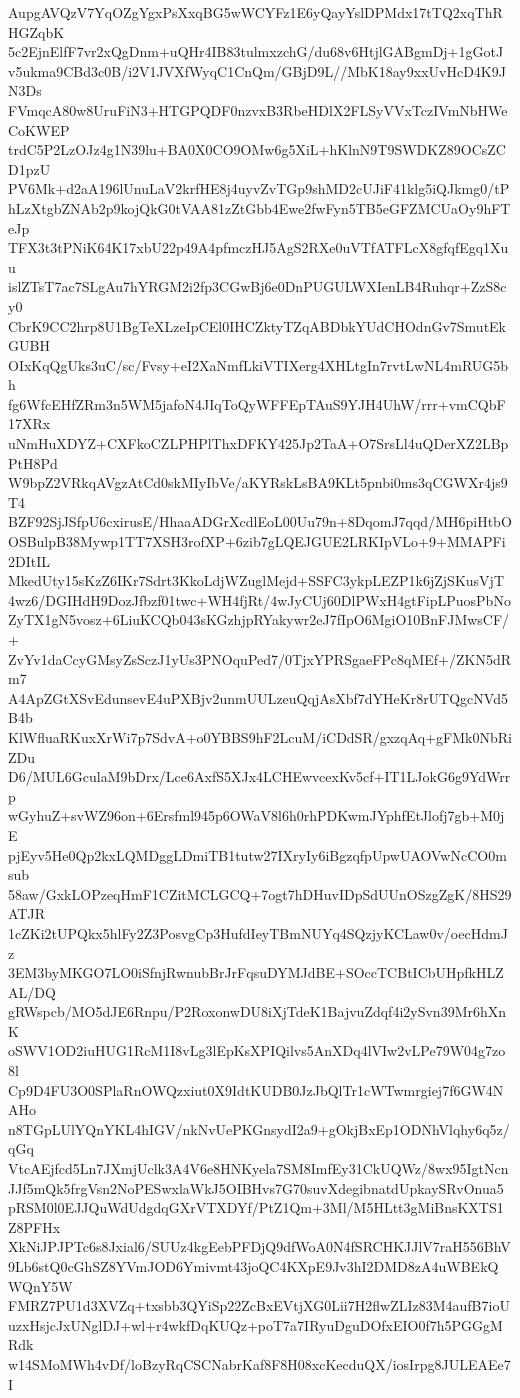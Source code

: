 AupgAVQzV7YqOZgYgxPsXxqBG5wWCYFz1E6yQayYslDPMdx17tTQ2xqThRHGZqbK
5c2EjnElfF7vr2xQgDnm+uQHr4IB83tulmxzchG/du68v6HtjlGABgmDj+1gGotJ
v5ukma9CBd3c0B/i2V1JVXfWyqC1CnQm/GBjD9L//MbK18ay9xxUvHcD4K9JN3Ds
FVmqcA80w8UruFiN3+HTGPQDF0nzvxB3RbeHDlX2FLSyVVxTczIVmNbHWeCoKWEP
trdC5P2LzOJz4g1N39lu+BA0X0CO9OMw6g5XiL+hKlnN9T9SWDKZ89OCsZCD1pzU
PV6Mk+d2aA196lUnuLaV2krfHE8j4uyvZvTGp9shMD2cUJiF41klg5iQJkmg0/tP
hLzXtgbZNAb2p9kojQkG0tVAA81zZtGbb4Ewe2fwFyn5TB5eGFZMCUaOy9hFTeJp
TFX3t3tPNiK64K17xbU22p49A4pfmczHJ5AgS2RXe0uVTfATFLcX8gfqfEgq1Xuu
islZTsT7ac7SLgAu7hYRGM2i2fp3CGwBj6e0DnPUGULWXIenLB4Ruhqr+ZzS8cy0
CbrK9CC2hrp8U1BgTeXLzeIpCEl0IHCZktyTZqABDbkYUdCHOdnGv7SmutEkGUBH
OIxKqQgUks3uC/sc/Fvsy+eI2XaNmfLkiVTIXerg4XHLtgIn7rvtLwNL4mRUG5bh
fg6WfcEHfZRm3n5WM5jafoN4JIqToQyWFFEpTAuS9YJH4UhW/rrr+vmCQbF17XRx
uNmHuXDYZ+CXFkoCZLPHPlThxDFKY425Jp2TaA+O7SrsLl4uQDerXZ2LBpPtH8Pd
W9bpZ2VRkqAVgzAtCd0skMIyIbVe/aKYRskLsBA9KLt5pnbi0ms3qCGWXr4js9T4
BZF92SjJSfpU6cxirusE/HhaaADGrXcdlEoL00Uu79n+8DqomJ7qqd/MH6piHtbO
OSBulpB38Mywp1TT7XSH3rofXP+6zib7gLQEJGUE2LRKIpVLo+9+MMAPFi2DItIL
MkedUty15sKzZ6IKr7Sdrt3KkoLdjWZuglMejd+SSFC3ykpLEZP1k6jZjSKusVjT
4wz6/DGIHdH9DozJfbzf01twc+WH4fjRt/4wJyCUj60DlPWxH4gtFipLPuosPbNo
ZyTX1gN5vosz+6LiuKCQb043sKGzhjpRYakywr2eJ7fIpO6MgiO10BnFJMwsCF/+
ZvYv1daCcyGMsyZsSczJ1yUs3PNOquPed7/0TjxYPRSgaeFPc8qMEf+/ZKN5dRm7
A4ApZGtXSvEdunsevE4uPXBjv2unmUULzeuQqjAsXbf7dYHeKr8rUTQgcNVd5B4b
KlWfluaRKuxXrWi7p7SdvA+o0YBBS9hF2LcuM/iCDdSR/gxzqAq+gFMk0NbRiZDu
D6/MUL6GculaM9bDrx/Lce6AxfS5XJx4LCHEwvcexKv5cf+IT1LJokG6g9YdWrrp
wGyhuZ+svWZ96on+6Ersfml945p6OWaV8l6h0rhPDKwmJYphfEtJlofj7gb+M0jE
pjEyv5He0Qp2kxLQMDggLDmiTB1tutw27IXryIy6iBgzqfpUpwUAOVwNcCO0msub
58aw/GxkLOPzeqHmF1CZitMCLGCQ+7ogt7hDHuvIDpSdUUnOSzgZgK/8HS29ATJR
1cZKi2tUPQkx5hlFy2Z3PosvgCp3HufdIeyTBmNUYq4SQzjyKCLaw0v/oecHdmJz
3EM3byMKGO7LO0iSfnjRwnubBrJrFqsuDYMJdBE+SOccTCBtICbUHpfkHLZAL/DQ
gRWspcb/MO5dJE6Rnpu/P2RoxonwDU8iXjTdeK1BajvuZdqf4i2ySvn39Mr6hXnK
oSWV1OD2iuHUG1RcM1I8vLg3lEpKsXPIQilvs5AnXDq4lVIw2vLPe79W04g7zo8l
Cp9D4FU3O0SPlaRnOWQzxiut0X9IdtKUDB0JzJbQlTr1cWTwmrgiej7f6GW4NAHo
n8TGpLUlYQnYKL4hIGV/nkNvUePKGnsydI2a9+gOkjBxEp1ODNhVlqhy6q5z/qGq
VtcAEjfcd5Ln7JXmjUclk3A4V6e8HNKyela7SM8ImfEy31CkUQWz/8wx95IgtNcn
JJf5mQk5frgVsn2NoPESwxlaWkJ5OIBHvs7G70suvXdegibnatdUpkaySRvOnua5
pRSM0l0EJJQuWdUdgdqGXrVTXDYf/PtZ1Qm+3Ml/M5HLtt3gMiBnsKXTS1Z8PFHx
XkNiJPJPTc6s8Jxial6/SUUz4kgEebPFDjQ9dfWoA0N4fSRCHKJJlV7raH556BhV
9Lb6stQ0cGhSZ8YVmJOD6Ymivmt43joQC4KXpE9Jv3hI2DMD8zA4uWBEkQWQnY5W
FMRZ7PU1d3XVZq+txsbb3QYiSp22ZcBxEVtjXG0Lii7H2flwZLIz83M4aufB7ioU
uzxHsjcJxUNglDJ+wl+r4wkfDqKUQz+poT7a7IRyuDguDOfxEIO0f7h5PGGgMRdk
w14SMoMWh4vDf/loBzyRqCSCNabrKaf8F8H08xcKecduQX/iosIrpg8JULEAEe7I
